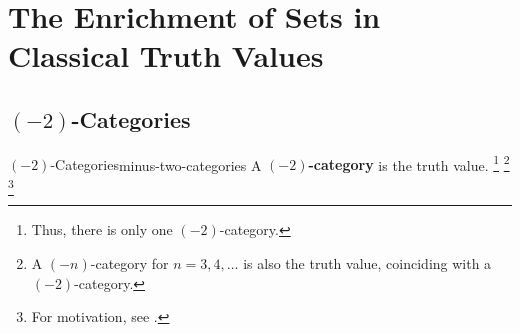 \section{The Enrichment of Sets in Classical Truth Values}\label{section-the-enrichment-of-sets-in-classical-truth-values}
\subsection{\texorpdfstring{$(-2)$}{(-2)}-Categories}\label{subsection-minus-two-categories}
\begin{definition}{$(-2)$-Categories}{minus-two-categories}%
    A \textbf{$(-2)$-category} is the  truth value.%
    \footnote{%
        Thus, there is only one $(-2)$-category.
    }%
    \footnote{%
        A $(-n)$-category for $n=3,4,\ldots$ is also the  truth value, coinciding with a $(-2)$-category.
    }%
    \footnote{%
        For motivation, see \cite[p.~13]{lectures-on-n-categories-and-cohomology}.
        \par\vspace*{-1.75\baselineskip}
    }%
\end{definition}
